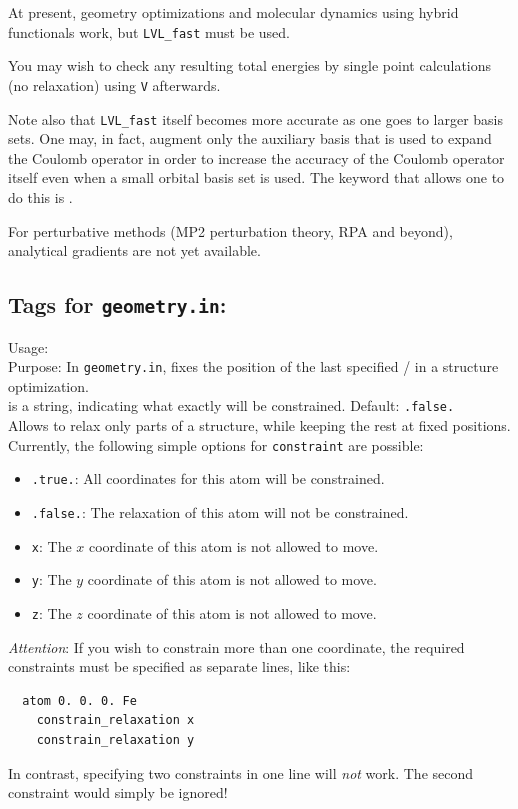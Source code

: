 At present, geometry optimizations and molecular dynamics using 
hybrid functionals work, but  \texttt{LVL\_fast} must be 
used.

You may wish to check any resulting total energies by single point 
calculations (no relaxation) using  \texttt{V}
afterwards.

Note also that  \texttt{LVL\_fast} itself becomes 
more accurate as one goes to larger basis sets. One may, in fact, augment
only the auxiliary basis that is used to expand the Coulomb operator
in order to increase the accuracy of the Coulomb operator itself even when
a small orbital basis set is used. The keyword that allows one to do this
is . 

For perturbative methods (MP2 perturbation theory, RPA and beyond),
analytical gradients are not yet available. 

\newpage

\subsection*{Tags for \texttt{geometry.in}:}

{
  \noindent 
  Usage:   \\[1.0ex]
  Purpose: In \texttt{geometry.in}, fixes the position of the last
    specified / in a structure optimization. \\[1.0ex]
   is a string, indicating what exactly will be
    constrained. Default: \texttt{.false.} \\
}
Allows to relax only parts of a structure, while keeping the rest at
fixed positions. Currently, the following simple options for
  \texttt{constraint} are possible:  
\begin{itemize}
  \item \texttt{.true.}: All coordinates for this atom will be constrained. 
  \item \texttt{.false.}: The relaxation of this atom will not be constrained.
  \item \texttt{x}: The $x$ coordinate of this atom is not allowed to move.
  \item \texttt{y}: The $y$ coordinate of this atom is not allowed to move.
  \item \texttt{z}: The $z$ coordinate of this atom is not allowed to move.
\end{itemize}
\emph{Attention}: If you wish to constrain more than one coordinate, the required
constraints must be specified as separate lines, like this:
\begin{verbatim}
  atom 0. 0. 0. Fe
    constrain_relaxation x
    constrain_relaxation y
\end{verbatim}
In contrast, specifying two constraints in one line will \emph{not} work. The
second constraint would simply be ignored!


